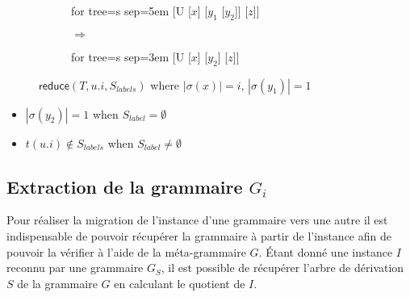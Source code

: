\begin{figure}[htb]
	\centering
	\begin{subfigure}[c]{0.4\textwidth}
		\centering
		\begin{adjustbox}{valign=c, max width=\textwidth}
			\begin{forest}
			for tree={s sep=5em}
			[U [$x$] [$y_1$ [$y_2$]] [$z$]]
			\end{forest}
		\end{adjustbox}
		\caption*{}
	\end{subfigure}
	\begin{subfigure}[c]{0.1\textwidth}
		\centering
		\huge{$\Rightarrow$}
	\end{subfigure}
	\begin{subfigure}[c]{0.4\textwidth}
		\centering
		\begin{adjustbox}{valign=c, max width=\textwidth}
			\begin{forest}
			for tree={s sep=3em}
			[U [$x$] [$y_2$] [$z$]]
			\end{forest}
		\end{adjustbox}
		\caption*{}
	\end{subfigure}
	\caption{$\textsf{reduce}(T, u.i, S_{labels})$ where $|\sigma(x)| = i$, $|\sigma(y_1)| = 1$}
	\label{fig:sch:op:reduce}
\end{figure}

\begin{itemize}
    \item $|\sigma(y_2)| = 1$ when $S_{label} = \emptyset$
    \item $t(u.i) \notin S_{labels}$ when $S_{label} \neq \emptyset$
\end{itemize}

\subsection{Extraction de la grammaire $G_i$}
Pour réaliser la migration de l'instance d'une grammaire vers une autre il est indispensable de pouvoir récupérer la grammaire à partir de l'instance afin de pouvoir la vérifier à l'aide de la méta-grammaire $G$.
Étant donné une instance $I$ reconnu par une grammaire $G_S$, il est possible de récupérer l'arbre de dérivation $S$ de la grammaire $G$ en calculant le quotient de $I$.

